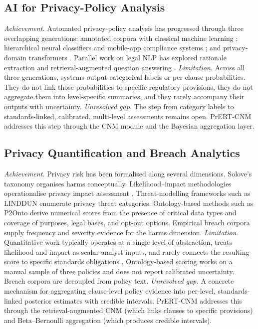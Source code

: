 \documentclass[final,3p,times,twocolumn]{elsarticle}
\begin{document}
	\subsection{AI for Privacy-Policy Analysis}
	\emph{Achievement.} Automated privacy-policy analysis has progressed through three
	overlapping generations: annotated corpora with classical machine learning
	\citep{wilson2016opp115,sathyendra2017optout,poplavska2020gdprmap};
	hierarchical neural classifiers and mobile-app compliance systems \citep{harkous2018polisis,zimmeck2019maps};
	and privacy-domain transformers \citep{devlin2019bert,srinath2021privaseer,muralitharan2024privacybertlstm}.
	Parallel work on legal NLP has explored rationale extraction and retrieval-augmented
	question answering \citep{chalkidis2022legalnlp,ravichander2019qa}. \emph{Limitation.}
	Across all three generations, systems output categorical labels or per-clause
	probabilities. They do not link those probabilities to specific regulatory provisions,
	they do not aggregate them into level-specific summaries, and they rarely accompany
	their outputs with uncertainty. \emph{Unresolved gap.} The step from category labels
	to standards-linked, calibrated, multi-level assessments remains open. PrERT-CNM
	addresses this step through the CNM module and the Bayesian aggregation layer.

	\subsection{Privacy Quantification and Breach Analytics}
	\emph{Achievement.} Privacy risk has been formalised along several dimensions.
	Solove's taxonomy \citep{solove2006taxonomy} organises harms conceptually.
	Likelihood--impact methodologies operationalise privacy impact assessment \citep{brooks2017nistpram,oetzel2014pia}.
	Threat-modelling frameworks such as LINDDUN \citep{deng2011linddun} enumerate
	privacy threat categories. Ontology-based methods such as P2Onto \citep{novikova2025privacyrisks}
	derive numerical scores from the presence of critical data types and coverage
	of purposes, legal bases, and opt-out options. Empirical breach corpora \citep{enisa_tl_2024,prc_breaches}
	supply frequency and severity evidence for the harms dimension. \emph{Limitation.}
	Quantitative work typically operates at a single level of abstraction, treats likelihood
	and impact as scalar analyst inputs, and rarely connects the resulting score
	to specific standards obligations \citep{arshad2024characterisation}. Ontology-based
	scoring \citep{novikova2025privacyrisks} works on a manual sample of three policies
	and does not report calibrated uncertainty. Breach corpora are decoupled from
	policy text. \emph{Unresolved gap.} A concrete mechanism for aggregating
	clause-level policy evidence into per-level, standards-linked posterior estimates
	with credible intervals. PrERT-CNM addresses this through the retrieval-augmented
	CNM (which links clauses to specific provisions) and Beta--Bernoulli aggregation
	(which produces credible intervals).
\end{document}
